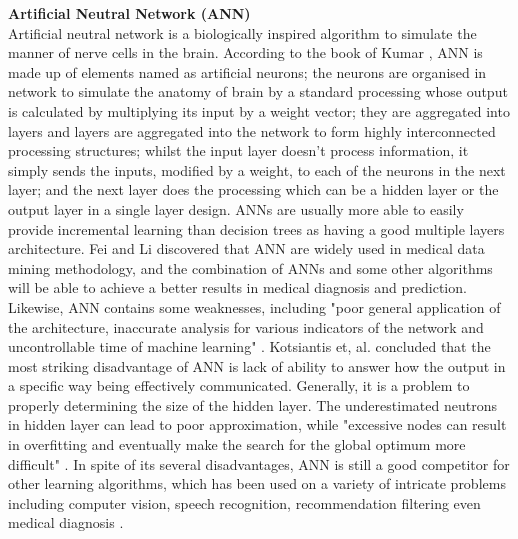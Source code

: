 \documentclass[12pt]{article}
\begin{document}
\textbf{Artificial Neutral Network (ANN)\\}
Artificial neutral network is a biologically inspired algorithm to simulate the manner of nerve cells in the brain. According to the book of Kumar \cite{Kumar}, ANN is made up of elements named as artificial neurons; the neurons are organised in network to simulate the anatomy of brain by a standard processing whose output is calculated by multiplying its input by a weight vector; they are aggregated into layers and layers are aggregated into the network to form highly interconnected processing structures; whilst the input layer doesn't process information, it simply sends the inputs, modified by a weight, to each of the neurons in the next layer; and the next layer does the processing which can be a hidden layer or the output layer in a single layer design. ANNs are usually more able to easily provide incremental learning than decision trees as having a good multiple layers architecture. Fei and Li \cite{Fei} discovered that ANN are widely used in medical data mining methodology, and the combination of ANNs and some other algorithms will be able to achieve a better results in medical diagnosis and prediction. Likewise, ANN contains some weaknesses, including "poor general application of the architecture, inaccurate analysis for various indicators of the network and uncontrollable time of machine learning" \cite{Fei}. Kotsiantis et, al. \cite{Kotsiantis}concluded that the most striking disadvantage of ANN is lack of ability to answer how the output in a specific way being effectively communicated. Generally, it is a problem to properly determining the size of the hidden layer. The underestimated neutrons in hidden layer can lead to poor approximation, while "excessive nodes can result in overfitting and eventually make the search for the global optimum more difficult" \cite{Kotsiantis}. In spite of its several disadvantages,  ANN is still a good competitor for other learning algorithms, which has been used on a variety of intricate problems including computer vision, speech recognition, recommendation filtering even medical diagnosis \cite{Somvanshi}\cite{Kumar}.
\\
\end{document}
